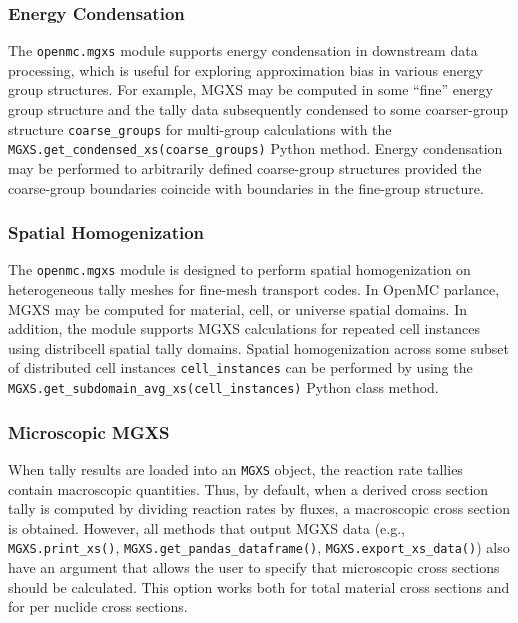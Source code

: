 \subsubsection{Energy Condensation}
\label{subsec:energy-condense}

The \texttt{openmc.mgxs} module supports energy condensation in downstream data processing, which is useful for exploring approximation bias in various energy group structures. For example, MGXS may be computed in some ``fine'' energy group structure and the tally data subsequently condensed to some coarser-group structure \texttt{coarse_groups} for multi-group calculations with the \texttt{MGXS.get_condensed_xs(coarse_groups)} Python method. Energy condensation may be performed to arbitrarily defined coarse-group structures provided the coarse-group boundaries coincide with boundaries in the fine-group structure.


\subsubsection{Spatial Homogenization}
\label{subsec:pinwise-homogenize}

The \texttt{openmc.mgxs} module is designed to perform spatial homogenization on heterogeneous tally meshes for fine-mesh transport codes. In OpenMC parlance, MGXS may be computed for material, cell, or universe spatial domains. In addition, the module supports MGXS calculations for repeated cell instances using distribcell spatial tally domains\cite{lax2014distribcell}. Spatial homogenization across some subset of distributed cell instances \texttt{cell_instances} can be performed by using the \texttt{MGXS.get_subdomain_avg_xs(cell_instances)} Python class method.



\subsubsection{Microscopic MGXS}
\label{subsec:micro-macro}

When tally results are loaded into an \texttt{MGXS} object, the reaction rate tallies contain macroscopic quantities. Thus, by default, when a derived cross section tally is computed by dividing reaction rates by fluxes, a macroscopic cross section is obtained. However, all methods that output MGXS data (\textrm{e.g.}, \texttt{MGXS.print_xs()}, \texttt{MGXS.get_pandas_dataframe()}, \texttt{MGXS.export_xs_data()}) also have an argument that allows the user to specify that microscopic cross sections should be calculated. This option works both for total material cross sections and for per nuclide cross sections.

